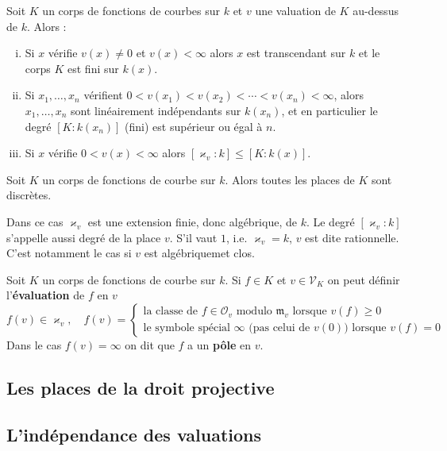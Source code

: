 	\begin{lem}
		Soit $K$ un corps de fonctions de courbes sur $k$ et $v$ une valuation de $K$ au-dessus de $k$.
		Alors :
		\begin{enumerate}[(i)]
			\item Si $x$ vérifie $v(x) \neq 0$ et $v(x) < \infty$ alors $x$ est transcendant sur $k$ et le corps $K$ est fini sur $k(x)$.
			\item Si $x_1,\ldots,x_n$ vérifient $0 < v(x_1) < v(x_2) < \cdots < v(x_n) < \infty$, alors $x_1,\ldots,x_n$ sont linéairement indépendants sur $k(x_n)$, et en particulier le degré $[K : k(x_n)]$ (fini) est supérieur ou égal à $n$.
			\item Si $x$ vérifie $0 < v(x) < \infty$ alors $[\varkappa_v : k] \leq [K : k(x)]$.
		\end{enumerate}
	\end{lem}

	\begin{pop}
		Soit $K$ un corps de fonctions de courbe sur $k$.
		Alors toutes les places de $K$ sont discrètes.
	\end{pop}

	Dans ce cas $\varkappa_v$ est une extension finie, donc algébrique, de $k$.
	Le degré $[\varkappa_v : k]$ s'appelle aussi degré de la place $v$.
	S'il vaut $1$, i.e. $\varkappa_v = k$, $v$ est dite rationnelle.
	C'est notamment le cas si $v$ est algébriquemet clos.
	
	\begin{defn}
		Soit $K$ un corps de fonctions de courbe sur $k$.
		Si $f \in K$ et $v \in \mathscr{V}_K$ on peut définir l'\textbf{évaluation} de $f$ en $v$
		$$f(v) \in \varkappa_v, \quad f(v) = \left\{ \begin{array}{l}
			\text{la classe de $f \in \mathcal{O}_v$ modulo $\mathfrak{m}_v$ lorsque $v(f) \geq 0$} \\
			\text{le symbole spécial $\infty$ (pas celui de $v(0)$) lorsque $v(f) = 0$}
			\end{array} \right.$$
		Dans le cas $f(v) = \infty$ on dit que $f$ a un \textbf{pôle} en $v$.
	\end{defn}
	


\subsection{Les places de la droit projective}

	


\subsection{L'indépendance des valuations}

